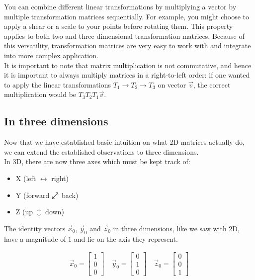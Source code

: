 \documentclass[12pt, a4paper]{article}
\newcommand{\neswarrow}{\ensurestackMath{\stackengine{0pt}{\nearrow}{\swarrow}{O}{c}{F}{F}{L}}}
\begin{document}
You can combine different linear transformations by multiplying a vector by
multiple transformation matrices sequentially. For example, you might choose to
apply a shear or a scale to your points before rotating them. This property
applies to both two and three dimensional transformation matrices. Because of
this versatility, transformation matrices are very easy to work with and
integrate into more complex application. \\

It is important to note that matrix multiplication is not commutative, and hence
it is important to always multiply matrices in a right-to-left order: if one
wanted to apply the linear transformations $T_1 \to T_2 \to T_3$ on vector
$\vec{v}$, the correct multiplication would be $T_3T_2T_1\vec{v}$.

\pagebreak
\subsection{In three dimensions}
Now that we have established basic intuition on what 2D matrices actually do, we
can extend the established observations to three dimensions. \\

In 3D, there are now three axes which must be kept track of:
\begin{itemize}[leftmargin=2cm]
    \item X (left $\leftrightarrow$ right)
    \item Y (forward $\neswarrow$ back)
    \item Z (up $\updownarrow$ down)
\end{itemize}

The identity vectors $\vec{x}_0$, $\vec{y}_0$ and $\vec{z}_0$ in three
dimensions, like we saw with 2D, have a magnitude of $1$ and lie on the axis
they represent.

\begin{align*}
    \vec{x}_0 = \begin{bmatrix} 1 \\ 0 \\ 0 \end{bmatrix}
    \quad
    \vec{y}_0 = \begin{bmatrix} 0 \\ 1 \\ 0 \end{bmatrix}
    \quad
    \vec{z}_0 = \begin{bmatrix} 0 \\ 0 \\ 1 \end{bmatrix}
\end{align*} \\
\end{document}
